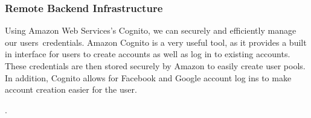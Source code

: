 \subsubsection{Remote Backend Infrastructure}
Using Amazon Web Services's Cognito, we can securely and efficiently manage our users\textquotesingle\ credentials. Amazon Cognito is a very useful tool, as it provides a built in interface for users to create accounts as well as log in to existing accounts. These credentials are then stored securely by Amazon to easily create user pools. In addition, Cognito allows for Facebook and Google account log ins to make account creation easier for the user.\par.
